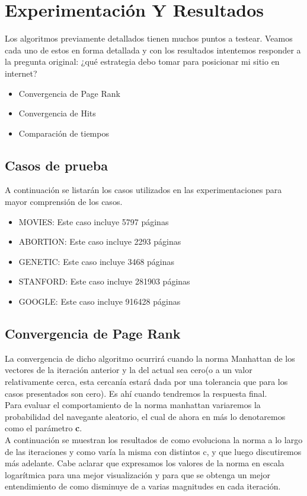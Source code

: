 \section{Experimentación Y Resultados}

  Los algoritmos previamente detallados tienen muchos puntos a testear. Veamos cada uno de estos en forma detallada y con los resultados intentemos responder a la pregunta original: ¿qué estrategia debo tomar para posicionar mi sitio en internet?

  \begin{itemize}
    \item{Convergencia de Page Rank}
    \item{Convergencia de Hits}
    \item{Comparación de tiempos}
  \end{itemize}


\subsection{Casos de prueba}
   A continuación se listarán los casos utilizados en las experimentaciones para mayor comprensión de los casos.

	\begin{itemize}
		\item MOVIES: Este caso incluye 5797 páginas
		\item ABORTION: Este caso incluye 2293 páginas
		\item GENETIC: Este caso incluye 3468 páginas
		\item STANFORD: Este caso incluye 281903 páginas
		\item GOOGLE: Este caso incluye 916428 páginas
	\end{itemize}  

\subsection{Convergencia de Page Rank} 

La convergencia de dicho algoritmo ocurrirá cuando la norma Manhattan de los vectores de la iteración anterior y la del actual sea cero(o a un valor relativamente cerca, esta cercanía estará dada por una tolerancia que para los casos presentados son cero). Es ahí cuando tendremos la respuesta final.\\
Para evaluar el comportamiento de la norma manhattan variaremos la probabilidad del navegante aleatorio, el cual de ahora en más lo denotaremos como el parámetro \textbf{c}.\\
A continuación se muestran los resultados de como evoluciona la norma a lo largo de las iteraciones y como varía la misma con distintos c, y que luego discutiremos más adelante.
Cabe aclarar que expresamos los valores de la norma en escala logarítmica para una mejor visualización y para que se obtenga un mejor entendimiento de como disminuye de a varias magnitudes en cada iteración.



